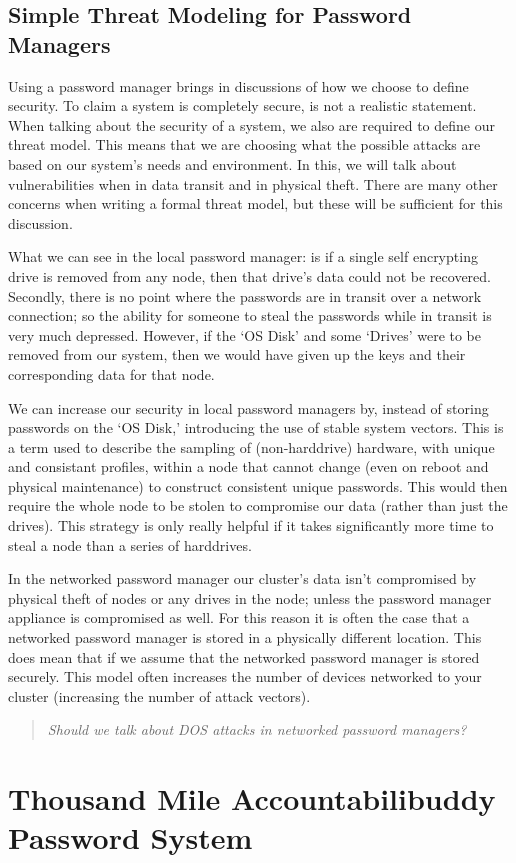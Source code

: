 \documentclass[11pt]{article} %
\def\aps{Accountabilibuddy Password System\xspace}
\def\ssv{stable system vectors\xspace}
\def\pm{password manager\xspace}
\def\lpm{local \pm}
\def\npm{networked \pm}
\def\tm{threat model\xspace}
\def\sed{self encrypting drive\xspace}
\begin{document}
\subsection*{Simple Threat Modeling for Password Managers}
Using a \pm brings in discussions of how we choose to define security. To claim a system is completely secure, is not a realistic statement. When talking about the security of a system, we also are required to define our \tm. This means that we are choosing what the possible attacks are based on our system's needs and environment. In this, we will talk about vulnerabilities when in data transit and in physical theft. There are many other concerns when writing a formal threat model, but these will be sufficient for this discussion.

What we can see in the \lpm: is if a single \sed is removed from any node, then that drive's data could not be recovered. Secondly, there is no point where the passwords are in transit over a network connection; so the ability for someone to steal the passwords while in transit is very much depressed. However, if the `OS Disk' and some `Drives' were to be removed from our system, then we would have given up the keys and their corresponding data for that node.

We can increase our security in \lpm{s} by, instead of storing passwords on the `OS Disk,' introducing the use of \ssv. This is a term used to describe the sampling of (non-harddrive) hardware, with unique and consistant profiles, within a node that cannot change (even on reboot and physical maintenance) to construct consistent unique passwords. This would then require the whole node to be stolen to compromise our data (rather than just the drives). This strategy is only really helpful if it takes significantly more time to steal a node than a series of harddrives.

In the \npm our cluster's data isn't compromised by physical theft of nodes or any drives in the node; unless the \pm appliance is compromised as well. For this reason it is often the case that a \npm is stored in a physically different location. This does mean that if we assume that the \npm is stored securely. This model often increases the number of devices networked to your cluster (increasing the number of attack vectors). 
\begin{quote}
{\em Should we talk about DOS attacks in \npm{s}?}
\end{quote}


\section*{Thousand Mile \aps}
\end{document}

